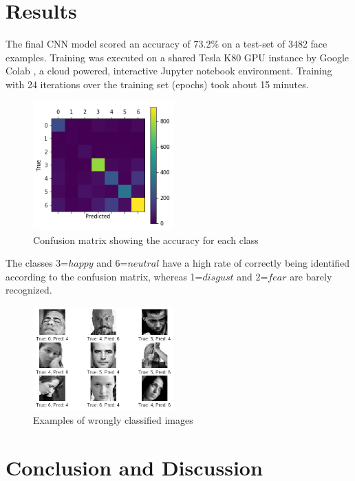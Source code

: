\documentclass[twoside]{article}
\begin{document}
\begin{multicols}{2}


\section{Results}
The final CNN model scored an accuracy of 73.2\% on a test-set of 3482 face examples. Training was executed on a shared Tesla K80 GPU instance by Google Colab \cite{colab}, a cloud powered, interactive Jupyter notebook environment. Training with 24 iterations over the training set (epochs) took about 15 minutes.

\begin{figure}[H]
	\includegraphics[width=0.48\textwidth]{confusion}
	\caption{Confusion matrix showing the accuracy for each class}
	\label{fig::confusion}
\end{figure}

The classes 3=$happy$ and 6=$neutral$ have a high rate of correctly being identified according to the confusion matrix, whereas 1=$disgust$ and 2=$fear$ are barely recognized.

\begin{figure}[H]
	\includegraphics[width=0.48\textwidth]{errors}
	\caption{Examples of wrongly classified images}
\end{figure}



\section{Conclusion and Discussion}


\end{multicols}
\end{document}
